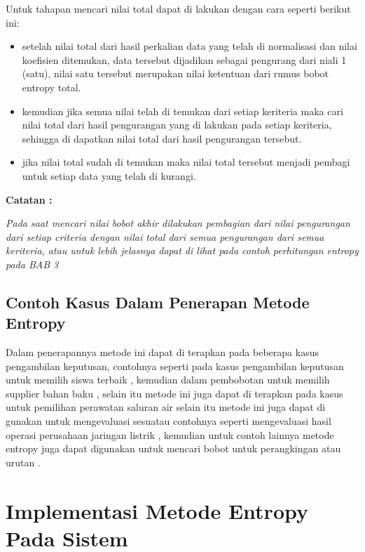 \begin{enumerate}
Untuk tahapan mencari nilai total dapat di lakukan dengan cara seperti berikut ini:

\begin{itemize}
\item setelah nilai total dari hasil perkalian data yang telah di normalisasi dan nilai koefisien ditemukan, data tersebut dijadikan sebagai pengurang dari niali 1 (satu), nilai satu tersebut merupakan nilai ketentuan dari rumus bobot entropy total.

\item kemudian jika semua nilai telah di temukan dari setiap keriteria maka cari nilai total dari hasil pengurangan yang di lakukan pada setiap keriteria, sehingga di dapatkan nilai total dari hasil pengurangan tersebut.

\item jika nilai total sudah di temukan maka nilai total tersebut menjadi pembagi untuk setiap data yang telah di kurangi.
\end{itemize}

\textbf{Catatan :}\par
\textit{Pada saat mencari nilai bobot akhir dilakukan pembagian dari nilai pengurangan dari setiap criteria dengan nilai total dari semua pengurangan dari semua keriteria, atau untuk lebih jelasnya dapat di lihat pada contoh perhitungan entropy pada BAB 3}
\end{enumerate}

\subsection{Contoh Kasus Dalam Penerapan Metode Entropy}

Dalam penerapannya metode ini dapat di terapkan pada beberapa kasus pengambilan keputusan, contohnya seperti pada kasus pengambilan keputusan untuk memilih siswa terbaik \cite{majdi2017penerapan}, kemudian dalam pembobotan untuk memilih supplier bahan baku \cite{saputra2016usulan}, selain itu metode ini juga dapat di terapkan pada kasus untuk pemilihan perawatan saluran air \cite{brankovic2018comparative} selain itu metode ini juga dapat di gunakan untuk mengevaluasi sesuatau contohnya seperti mengevaluasi hasil operasi perusahaan jaringan listrik \cite{wu2018comprehensive}, kemudian untuk contoh lainnya metode entropy juga dapat digunakan untuk mencari bobot untuk perangkingan atau urutan \cite{harahap2017penerapan}.

\section{Implementasi Metode Entropy Pada Sistem}

